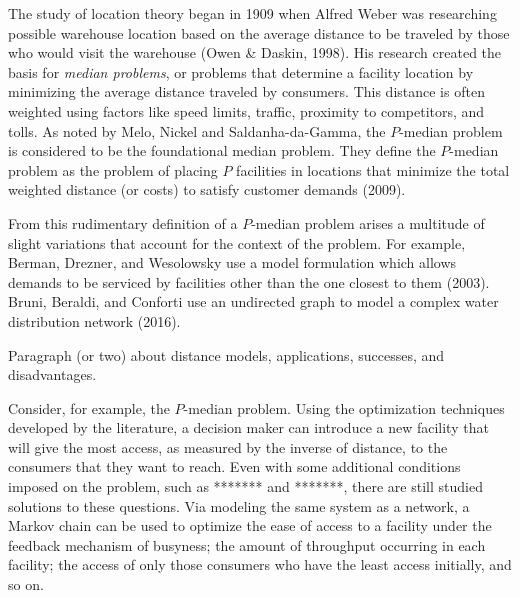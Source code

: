 \documentclass[twoside,twocolumn]{article}
\begin{document}
The study of location theory began in 1909 when Alfred Weber was researching possible warehouse location based on the average distance to be traveled by those who would visit the warehouse (Owen \& Daskin, 1998).
His research created the basis for {\em median problems}, or problems that determine a facility location by minimizing the average distance traveled by consumers.
This distance is often weighted using factors like speed limits, traffic, proximity to competitors, and tolls. %
As noted by Melo, Nickel and Saldanha-da-Gamma, the $P$-median problem is considered to be the foundational median problem.
They define the $P$-median problem as the problem of placing $P$ facilities in locations that minimize the total weighted distance (or costs) to satisfy customer demands (2009).

From this rudimentary definition of a $P$-median problem arises a multitude of slight variations that account for the context of the problem.
For example, Berman, Drezner, and Wesolowsky use a model formulation which allows demands to be serviced by facilities other than the one closest to them (2003).
Bruni, Beraldi, and Conforti use an undirected graph to model a complex water distribution network (2016).

Paragraph (or two) about distance models, applications, successes, and disadvantages.






Consider, for example, the $P$-median problem.
Using the optimization techniques developed by the literature, a decision maker can introduce a new facility that will give the most access, as measured by the inverse of distance, to the consumers that they want to reach. %
Even with some additional conditions imposed on the problem, such as ******* and *******, there are still studied solutions to these questions.%
Via modeling the same system as a network, a Markov chain can be used to optimize the ease of access to a facility under the feedback mechanism of busyness; the amount of throughput occurring in each facility; the access of only those consumers who have the least access initially, and so on. %
\end{document}

